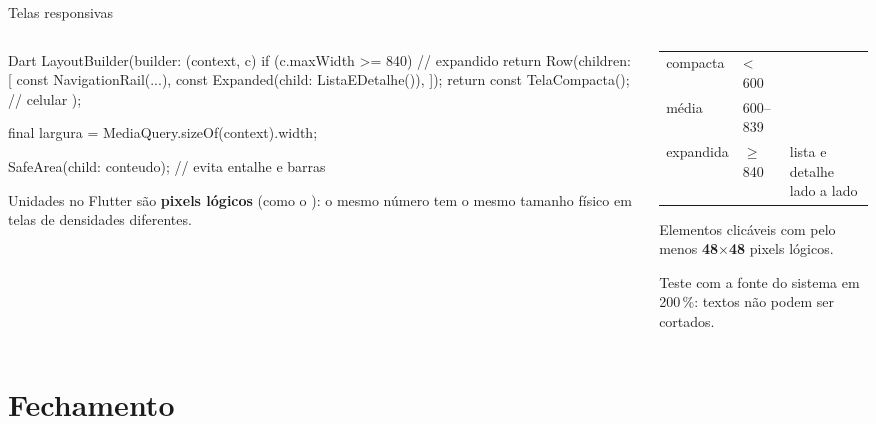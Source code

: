 \documentclass[aspectratio=169,10pt]{beamer}
\begin{document}
\begin{frame}[fragile]{Telas responsivas}
  \begin{columns}[T]
    \begin{column}{0.54\textwidth}
\begin{codigo}[title=layout\_adaptativo.dart]{Dart}
LayoutBuilder(builder: (context, c) {
  if (c.maxWidth >= 840) {          // expandido
    return Row(children: [
      const NavigationRail(...),
      const Expanded(child: ListaEDetalhe()),
    ]);
  }
  return const TelaCompacta();      // celular
});

final largura = MediaQuery.sizeOf(context).width;

SafeArea(child: conteudo);  // evita entalhe e barras
\end{codigo}
      \begin{dica}
        Unidades no Flutter são \textbf{pixels lógicos} (como o ): o mesmo número tem o mesmo tamanho físico em telas de densidades diferentes.
      \end{dica}
    \end{column}
    \begin{column}{0.44\textwidth}
      \scriptsize
      \begin{tabularx}{\linewidth}{@{}l l L@{}}
        \toprule
         &  &  \\
        \midrule
        compacta & < 600 &  \\
        média & 600--839 &  \\
        expandida & $\geq$ 840 & lista e detalhe lado a lado \\
        \bottomrule
      \end{tabularx}
      \begin{atencao}
        Elementos clicáveis com pelo menos \textbf{48$\times$48} pixels lógicos.
      \end{atencao}
      \begin{atencao}
        Teste com a fonte do sistema em 200\,\%: textos não podem ser cortados.
      \end{atencao}
    \end{column}
  \end{columns}
\end{frame}

\section{Fechamento}
\end{document}
